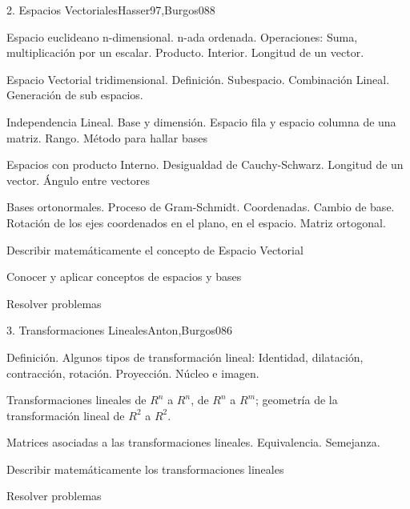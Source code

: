\begin{syllabus}
\begin{unit}{2. Espacios Vectoriales}{Hasser97,Burgos08}{8}
\begin{topics}
	\item Espacio euclideano n-dimensional. n-ada ordenada. Operaciones: Suma, multiplicación por un escalar. Producto. Interior. Longitud de un vector.
	\item Espacio Vectorial tridimensional. Definición. Subespacio. Combinación Lineal. Generación de sub espacios.
      \item Independencia Lineal. Base y dimensión. Espacio fila y espacio columna de una matriz. Rango. Método para hallar bases
      \item Espacios con producto Interno. Desigualdad de Cauchy-Schwarz. Longitud de un vector. Ángulo entre vectores
      \item Bases ortonormales. Proceso de Gram-Schmidt. Coordenadas. Cambio de base. Rotación de los ejes coordenados en el plano, en el espacio. Matriz ortogonal.
    \end{topics}
   \begin{learningoutcomes}
      \item Describir matemáticamente el concepto de Espacio Vectorial
      \item Conocer y aplicar conceptos de espacios y bases
	\item Resolver problemas
   \end{learningoutcomes}
\end{unit}

\begin{unit}{3. Transformaciones Lineales}{Anton,Burgos08}{6}
\begin{topics}
      \item Definición. Algunos tipos de transformación lineal: Identidad, dilatación, contracción, rotación. Proyección. Núcleo e imagen.
      \item Transformaciones lineales de $R^n$ a $R^n$, de $R^n$ a $R^m$; geometría de la transformación lineal de $R^2$ a $R^2$.
      \item Matrices asociadas a las transformaciones lineales. Equivalencia. Semejanza.
\end{topics}

   \begin{learningoutcomes}
      \item Describir matemáticamente los transformaciones lineales
	\item Resolver problemas
   \end{learningoutcomes}
\end{unit}


\end{syllabus}
